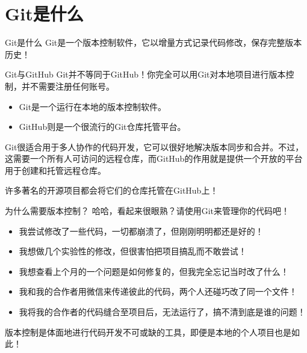 \section{Git是什么}

\begin{frame}{Git是什么}
    Git是一个版本控制软件，它以增量方式记录代码修改，保存完整版本历史！
\end{frame}

\begin{frame}{Git与GitHub}
    \alert{Git并不等同于GitHub}！你完全可以用Git对本地项目进行版本控制，并不需要注册任何账号。
    
    \begin{itemize}
        \item Git是一个运行在本地的版本控制软件。
        \item GitHub则是一个很流行的Git仓库托管平台。
    \end{itemize}

    Git很适合用于多人协作的代码开发，它可以很好地解决版本同步和合并。不过，这需要一个所有人可访问的远程仓库，而GitHub的作用就是提供一个开放的平台用于创建和托管远程仓库。
    
    \alert{许多著名的开源项目都会将它们的仓库托管在GitHub上}！
\end{frame}

\begin{frame}{为什么需要版本控制？}
    哈哈，看起来很眼熟？\alert{请使用Git来管理你的代码吧}！
    \begin{itemize}
        \item 我尝试修改了一些代码，一切都崩溃了，但刚刚明明都还是好的！
        \item 我想做几个实验性的修改，但很害怕把项目搞乱而不敢尝试！
        \item 我想查看上个月的一个问题是如何修复的，但我完全忘记当时改了什么！
        \item 我和我的合作者用微信来传递彼此的代码，两个人还碰巧改了同一个文件！
        \item 我将我的合作者的代码缝合至项目后，无法运行了，搞不清到底是谁的问题！
    \end{itemize}
    版本控制是体面地进行代码开发不可或缺的工具，即便是本地的个人项目也是如此！
\end{frame}
